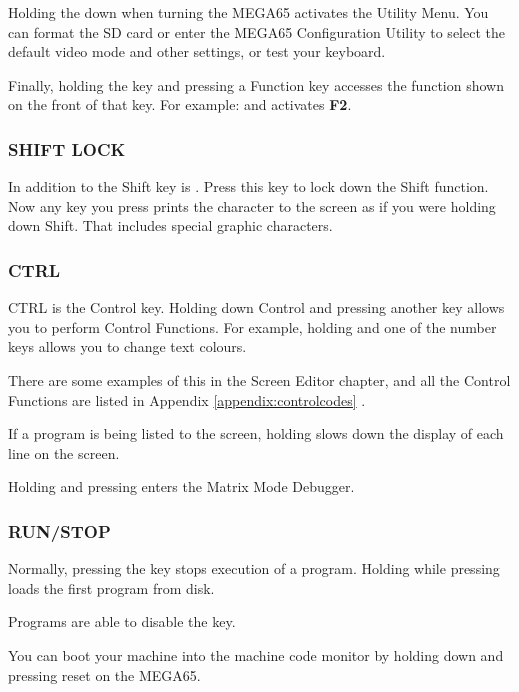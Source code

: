 Holding the  down when turning the MEGA65 activates the Utility Menu. You can format the SD card or enter the MEGA65 Configuration Utility to select the default video mode and other settings, or test your keyboard.

Finally, holding the  key and pressing a Function key accesses the function shown on the front of that key. For example:  and  activates \textbf{F2}.


\subsubsection{SHIFT LOCK}

In addition to the Shift key is . Press this key to lock down the Shift function. Now any key you press prints the character to the screen as if you were holding down Shift. That includes special graphic characters.

\subsubsection{CTRL}

CTRL is the Control key. Holding down Control and pressing another key allows you to perform Control Functions. For example, holding  and one of the number keys allows you to change text colours.

There are some examples of this in the Screen Editor chapter, and all the Control Functions are listed in Appendix \ref{appendix:controlcodes}  .

If a program is being listed to the screen, holding  slows down the display of each line on the screen.

Holding  and pressing \megakey{*} enters the Matrix Mode Debugger.

\subsubsection{RUN/STOP}

Normally, pressing the  key stops execution of a program. Holding  while pressing  loads the first program from disk.

Programs are able to disable the  key.

You can boot your machine into the machine code monitor by holding down  and pressing reset on the MEGA65.

